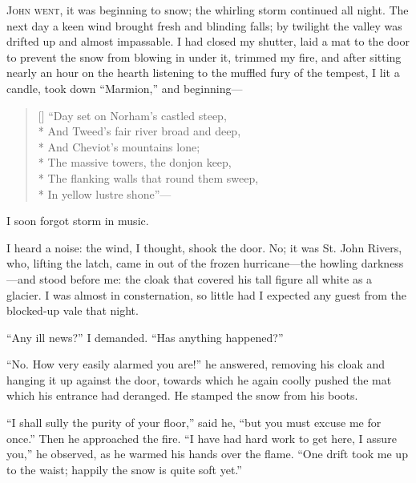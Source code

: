 
 \textsc{\Mr{} \St{} John went,} it was beginning to snow; the whirling storm
continued all night. The next day a keen wind brought fresh and
blinding falls; by twilight the valley was drifted up and almost
impassable. I had closed my shutter, laid a mat to the door to prevent
the snow from blowing in under it, trimmed my fire, and after sitting
nearly an hour on the hearth listening to the muffled fury of the
tempest, I lit a candle, took down \enquote{Marmion,} and beginning---

\begin{verse}[\versewidth]
\enquote{Day set on Norham's castled steep,\\*
And Tweed's fair river broad and deep,\\*
\hspace*{0.333em}\hspace*{0.333em} And Cheviot's mountains lone;\\*
The massive towers, the donjon keep,\\*
The flanking walls that round them sweep,\\*
\hspace*{0.333em}\hspace*{0.333em} In yellow lustre shone}---
\end{verse}

I soon forgot storm in music.

I heard a noise: the wind, I thought, shook the door. No; it was St.
John Rivers, who, lifting the latch, came in out of the frozen
hurricane---the howling darkness---and stood before me: the cloak that
covered his tall figure all white as a glacier. I was almost in
consternation, so little had I expected any guest from the blocked-up
vale that night.

\enquote{Any ill news?} I demanded. \enquote{Has anything happened?}

\enquote{No. How very easily alarmed you are!} he answered, removing
his cloak and hanging it up against the door, towards which he again
coolly pushed the mat which his entrance had deranged. He stamped the
snow from his boots.

\enquote{I shall sully the purity of your floor,} said he, \enquote{but
you must excuse me for once.} Then he approached the fire. \enquote{I
have had hard work to get here, I assure you,} he observed, as he warmed
his hands over the flame. \enquote{One drift took me up to the waist;
happily the snow is quite soft yet.}

